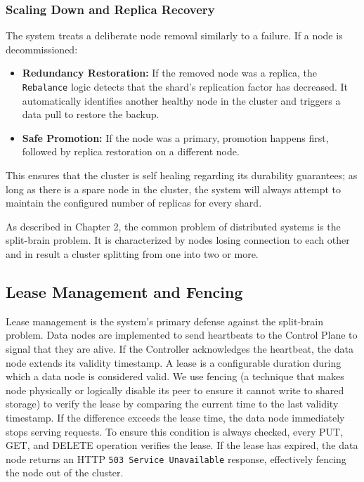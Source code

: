 \documentclass[shortabstract]{iithesis}
\begin{document}
\subsubsection{Scaling Down and Replica Recovery}
The system treats a deliberate node removal similarly to a failure. If a node is decommissioned:
\begin{itemize}
    \item \textbf{Redundancy Restoration:} If the removed node was a replica, the \\ \texttt{Rebalance} logic detects that the shard's replication factor has decreased. It automatically identifies another healthy node in the cluster and triggers a data pull to restore the backup.
    \item \textbf{Safe Promotion:} If the node was a primary, promotion happens first, followed by replica restoration on a different node.
\end{itemize}
This ensures that the cluster is self healing regarding its durability guarantees; as long as there is a spare node in the cluster, the system will always attempt to maintain the configured number of replicas for every shard.

As described in Chapter 2, the common problem of distributed systems is the split-brain problem. It is characterized by nodes losing connection to each other and in result a cluster splitting from one into two or more. 

\subsection{Lease Management and Fencing}

Lease management is the system's primary defense against the split-brain problem. Data nodes are implemented to send heartbeats to the Control Plane to signal that they are alive. If the Controller acknowledges the heartbeat, the data node extends its validity timestamp. A lease is a configurable duration during which a data node is considered valid. We use fencing (a technique that makes node physically or logically disable its peer to ensure it cannot write to shared storage) to verify the lease by comparing the current time to the last validity timestamp. If the difference exceeds the lease time, the data node immediately stops serving requests. To ensure this condition is always checked, every PUT, GET, and DELETE operation verifies the lease. If the lease has expired, the data node returns an HTTP \texttt{503 Service Unavailable} response, effectively fencing the node out of the cluster.
\end{document}
